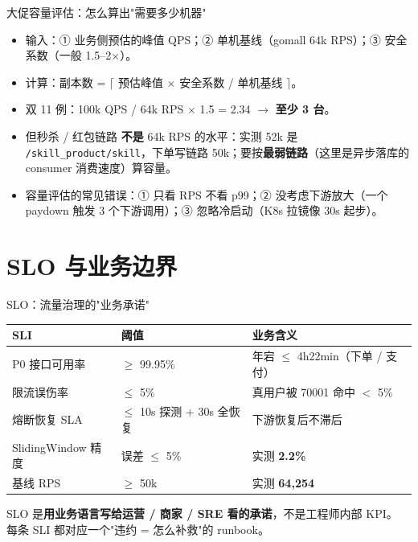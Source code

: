 \documentclass[aspectratio=169,11pt]{beamer}
\begin{document}
\begin{frame}[shrink]{大促容量评估：怎么算出"需要多少机器"}
\begin{itemize}
  \item 输入：① 业务侧预估的峰值 QPS；② 单机基线（gomall 64k RPS）；③ 安全系数（一般 1.5--2$\times$）。
  \item 计算：副本数 = $\lceil$ 预估峰值 $\times$ 安全系数 / 单机基线 $\rceil$。
  \item 双 11 例：100k QPS / 64k RPS $\times$ 1.5 = 2.34 $\to$ \textbf{至少 3 台}。
  \item 但秒杀 / 红包链路 \textbf{不是} 64k RPS 的水平：实测 52k 是 \texttt{/skill\_product/skill}，下单写链路 50k；要按\textbf{最弱链路}（这里是异步落库的 consumer 消费速度）算容量。
  \item 容量评估的常见错误：① 只看 RPS 不看 p99；② 没考虑下游放大（一个 paydown 触发 3 个下游调用）；③ 忽略冷启动（K8s 拉镜像 30s 起步）。
\end{itemize}
\end{frame}

\section{SLO 与业务边界}

\begin{frame}[shrink]{SLO：流量治理的"业务承诺"}
\begin{tabular}{@{}lll@{}}
\toprule
SLI & 阈值 & 业务含义 \\
\midrule
P0 接口可用率 & $\ge$ 99.95\%       & 年宕 $\le$ 4h22min（下单 / 支付） \\
限流误伤率   & $\le$ 5\%           & 真用户被 70001 命中 $<$ 5\% \\
熔断恢复 SLA & $\le$ 10s 探测 + 30s 全恢复 & 下游恢复后不滞后 \\
SlidingWindow 精度 & 误差 $\le$ 5\%      & 实测 \textbf{2.2\%} \\
基线 RPS    & $\ge$ 50k           & 实测 \textbf{64{,}254} \\
\bottomrule
\end{tabular}
\vspace{2mm}
\small SLO 是\textbf{用业务语言写给运营 / 商家 / SRE 看的承诺}，不是工程师内部 KPI。\\
每条 SLI 都对应一个"违约 = 怎么补救"的 runbook。
\end{frame}
\end{document}

